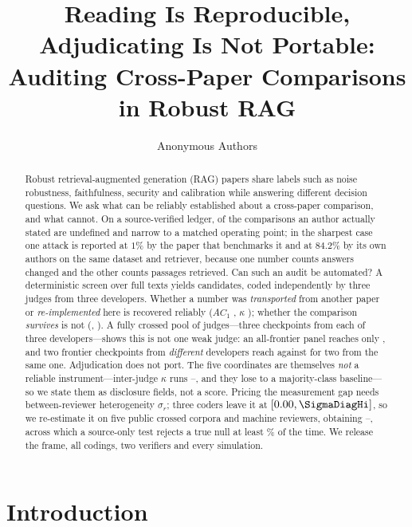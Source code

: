 \documentclass[11pt]{article}
\title{Reading Is Reproducible, Adjudicating Is Not Portable:\\
Auditing Cross-Paper Comparisons in Robust RAG}
\author{Anonymous Authors}
\date{}
\begin{document}
\maketitle

\begin{abstract}
Robust retrieval-augmented generation (RAG) papers share labels such as noise
robustness, faithfulness, security and calibration while answering different
decision questions. We ask what can be reliably established about a cross-paper
comparison, and what cannot. On a source-verified ledger, \LedgerStatedUndef{}
of the \LedgerStated{} comparisons an author actually stated are undefined and
\LedgerStatedNarrow{} narrow to a matched operating point; in the sharpest case
one attack is reported at $1\%$ by the paper that benchmarks it and at $84.2\%$
by its own authors on the same dataset and retriever, because one number counts
answers changed and the other counts passages retrieved. Can such an audit be automated? A deterministic
screen over \FrameScreened{} full texts yields \FrameCandidates{} candidates,
coded independently by three judges from three developers. Whether a number was
\emph{transported} from another paper or \emph{re-implemented} here is recovered
reliably ($AC_1$ \DecProv{}, $\kappa$ \DecProvK{}); whether the comparison
\emph{survives} is not (\DecVerdict{}, \DecVerdictK{}). A fully crossed pool of
\TierPanelN{} judges---three checkpoints from each of three developers---shows
this is not one weak judge: an all-frontier panel reaches only
\TierFrontierVerdictK{}, and two frontier checkpoints from \emph{different}
developers reach \TierCompFFCross{} against \TierCompFFSame{} for two from the
same one. Adjudication does not port. The five
coordinates are themselves \emph{not} a reliable instrument---inter-judge
$\kappa$ runs \DecCoordKMin{}--\DecCoordKMax{}, and they lose to a
majority-class baseline---so we state them as disclosure fields, not a score.
Pricing the
measurement gap needs between-reviewer heterogeneity $\sigma_r$; three coders
leave it at $[0.00,\SigmaDiagHi]$, so we re-estimate it on five public crossed
corpora and \SigmaPanelReviewers{} machine reviewers, obtaining
\SigmaMin{}--\SigmaMax{}, across which a source-only test rejects a true null at
least \SimMinSize\% of the time. We release the frame, all codings, two
verifiers and every simulation.
\end{abstract}

\section{Introduction}
\end{document}
